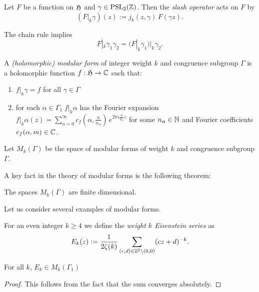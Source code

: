 \begin{definition}\label{def-slash-operator}
    Let $F$ be a  function on $\mathfrak{H}$ and $\gamma\in\mathrm{PSL}_2(\mathbb{Z})$. Then the \emph{slash operator} acts on $F$ by
$$(F|_k\gamma)(z):=j_k(z,\gamma)\,F(\gamma z). $$
\end{definition}

\begin{lemma}\label{lemma-slash-operator-chail-rule}
    The chain rule implies
$$F|_k\gamma_1\gamma_2=(F|_k\gamma_1)|_k\gamma_2.$$
\end{lemma}

\begin{definition}\label{def-holomorphic-modular-form}%
A \emph{(holomorphic) modular form} of integer weight $k$ and congruence subgroup $\Gamma$ is a holomorphic function $f:\mathfrak{H}\to\mathbb{C}$ such that:
\begin{enumerate}
  \item $f|_k\gamma=f$ for all $\gamma\in\Gamma$
  \item for each $\alpha\in\Gamma_1\;f|_k\alpha$ has the Fourier expansion $f|_k\alpha (z)=\sum_{n=0}^\infty c_f(\alpha,\frac{n}{n_\alpha})\,e^{2\pi i \frac{n}{n_\alpha}z}$ for some $n_\alpha\in\mathbb{N}$ and Fourier coefficients $c_f(\alpha,m)\in\mathbb{C}$.
\end{enumerate}
\end{definition}

\begin{definition}\label{def-Mk}
    Let $M_k(\Gamma)$ be the space of modular forms of weight $k$ and congruence subgroup $\Gamma$.
\end{definition}

A key fact in the theory of modular forms is the following theorem:
\begin{theorem}\label{theorem-Mk-finite-dimensional}
    The spaces $M_k(\Gamma)$ are finite dimensional.
\end{theorem}

Let us consider several examples of modular forms.
\begin{definition}\label{def-Ek-definition}%
For an even integer $k\geq 4$ we define the \emph{weight $k$ Eisenstein series} as
\begin{equation}\label{eqn-Ek-definition}
E_k(z):=\frac{1}{2\zeta(k)}\sum_{(c,d)\in\mathbb{Z}^2\backslash(0,0)}(cz+d)^{-k}.\end{equation}
\end{definition}
\begin{lemma}\label{lemma-Ek-is-modular-form}
    For all $k$, $E_k\in M_k(\Gamma_1)$
\end{lemma}
\begin{proof}
    This follows from the fact that the sum converges absolutely.
\end{proof}

